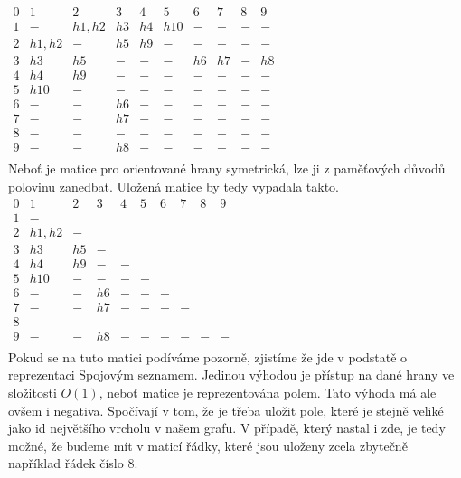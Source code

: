 \documentclass[
12pt,
a4paper,
pdftex,
czech,
titlepage
]{report}
\begin{document}
$\begin{matrix}
 0 & 1 & 2 & 3 & 4 & 5 & 6 & 7 & 8 & 9 \\
 1 & - & h1,h2 & h3 & h4 & h10 & - & - & - & - \\
 2 & h1,h2 & - & h5 & h9 & - & - & - & - & - \\
 3 & h3 & h5  & - & - & - & h6 & h7 & - & h8 \\
 4 & h4 & h9 & - & - & - & - & - & - & - \\
 5 & h10 & - & - & - & - & - & - & - & - \\
 6 & - & - & h6 & - & - & - & - & - & - \\
 7 & - & - & h7 & - & - & - & - & - & - \\
 8 & - & - & - & - & - & - & - & - & - \\
 9 & - & - & h8 & - & - & - & - & - & - \\
\end{matrix}$\\

Neboť je matice pro orientované hrany symetrická, lze ji z paměťových důvodů polovinu zanedbat.
Uložená matice by tedy vypadala takto.\\

$\begin{matrix}
0 & 1 & 2 & 3 & 4 & 5 & 6 & 7 & 8 & 9 \\
1 & -  \\
2 & h1,h2 & -  \\
3 & h3 & h5  & -  \\
4 & h4 & h9 & - & -  \\
5 & h10 & - & - & - & -  \\
6 & - & - & h6 & - & - & - \\
7 & - & - & h7 & - & - & - & - \\
8 & - & - & - & - & - & - & - & -  \\
9 & - & - & h8 & - & - & - & - & - & - \\
\end{matrix}$\\

Pokud se na tuto matici podíváme pozorně, zjistíme že jde v podstatě o reprezentaci Spojovým seznamem. Jedinou výhodou je přístup na dané hrany ve složitosti $O(1)$, neboť matice je reprezentována polem. Tato výhoda má ale ovšem i negativa. Spočívají v tom, že je třeba uložit pole, které je stejně veliké jako id největšího vrcholu v našem grafu. V případě, který nastal i zde, je tedy možné, že budeme mít v maticí řádky, které jsou uloženy zcela zbytečně například řádek číslo 8.\\
\end{document}
